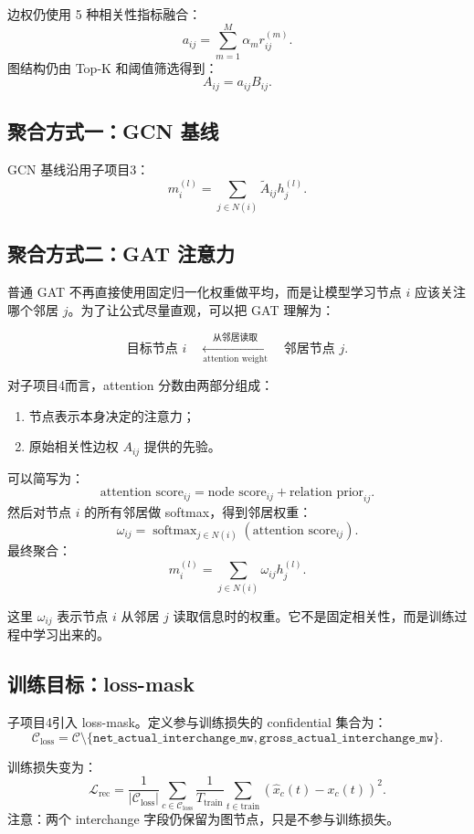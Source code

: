 \documentclass[UTF8]{ctexart}
\begin{document}
边权仍使用 5 种相关性指标融合：
\[
a_{ij}=\sum_{m=1}^{M}\alpha_m r_{ij}^{(m)}.
\]
图结构仍由 Top-K 和阈值筛选得到：
\[
A_{ij}=a_{ij}B_{ij}.
\]

\subsection{聚合方式一：GCN 基线}

GCN 基线沿用子项目3：
\[
m_i^{(l)}
=
\sum_{j\in N(i)}
\tilde{A}_{ij}h_j^{(l)}.
\]

\subsection{聚合方式二：GAT 注意力}

普通 GAT 不再直接使用固定归一化权重做平均，而是让模型学习节点 \(i\) 应该关注哪个邻居 \(j\)。为了让公式尽量直观，可以把 GAT 理解为：

\[
\text{目标节点 } i
\quad \xleftarrow[\text{attention weight}]{\text{从邻居读取}}
\quad
\text{邻居节点 } j.
\]

对子项目4而言，attention 分数由两部分组成：
\begin{enumerate}
    \item 节点表示本身决定的注意力；
    \item 原始相关性边权 \(A_{ij}\) 提供的先验。
\end{enumerate}

可以简写为：
\[
\text{attention score}_{ij}
=
\text{node score}_{ij}
+
\text{relation prior}_{ij}.
\]
然后对节点 \(i\) 的所有邻居做 softmax，得到邻居权重：
\[
\omega_{ij}
=
\operatorname{softmax}_{j\in N(i)}
(\text{attention score}_{ij}).
\]
最终聚合：
\[
m_i^{(l)}
=
\sum_{j\in N(i)}\omega_{ij}h_j^{(l)}.
\]

这里 \(\omega_{ij}\) 表示节点 \(i\) 从邻居 \(j\) 读取信息时的权重。它不是固定相关性，而是训练过程中学习出来的。

\subsection{训练目标：loss-mask}

子项目4引入 loss-mask。定义参与训练损失的 confidential 集合为：
\[
\mathcal{C}_{\text{loss}}
=
\mathcal{C}
\setminus
\{
\texttt{net\_actual\_interchange\_mw},
\texttt{gross\_actual\_interchange\_mw}
\}.
\]

训练损失变为：
\[
\mathcal{L}_{\text{rec}}
=
\frac{1}{|\mathcal{C}_{\text{loss}}|}
\sum_{c\in\mathcal{C}_{\text{loss}}}
\frac{1}{T_{\text{train}}}
\sum_{t\in\text{train}}
(\hat{x}_c(t)-x_c(t))^2.
\]
注意：两个 interchange 字段仍保留为图节点，只是不参与训练损失。
\end{document}
